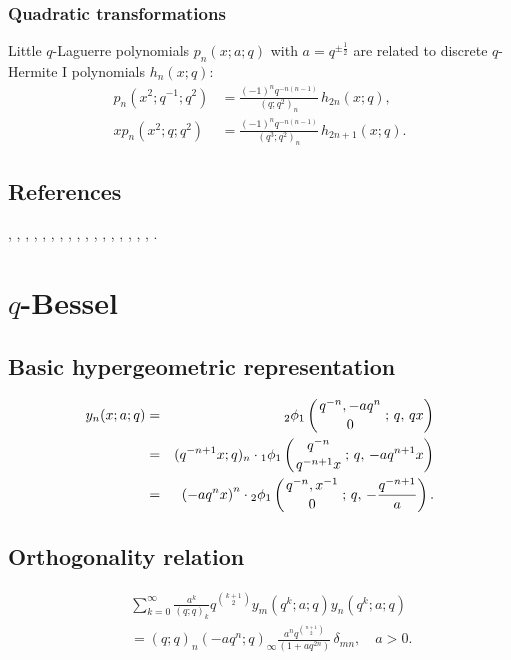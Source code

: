 \documentclass[envcountchap,graybox]{svmono}
\newcommand{\qhyp}[5]{\mbox{}_{#1}{\phi}_{#2}
\left(\genfrac{}{}{0pt}{}{#3}{#4}\,;\,q,\,#5\right)}
\newcommand\half{\frac12}
\newcommand{\qhyp}[5]{\,\mbox{}_{#1}\phi_{#2}\!\left(
  \genfrac{}{}{0pt}{}{#3}{#4};#5\right)}
\begin{document}
{{\subsubsection*{Quadratic transformations}
Little $q$-Laguerre polynomials $p_n(x;a;q)$ with $a=q^{\pm\half}$ are
related to discrete $q$-Hermite I polynomials $h_n(x;q)$:
\begin{align}
p_n(x^2;q^{-1};q^2)&=
\frac{(-1)^n q^{-n(n-1)}}{(q;q^2)_n}\,h_{2n}(x;q),
\label{28}\\
xp_n(x^2;q;q^2)&=
\frac{(-1)^n q^{-n(n-1)}}{(q^3;q^2)_n}\,h_{2n+1}(x;q).
\label{29}
\end{align}
%

\subsection*{References}
\cite{NAlSalam89}, \cite{AlSalam90}, \cite{Askey86}, \cite{Askey89I}, \cite{AskeyWilson85},
\cite{AtakAtakI}, \cite{ChenIsmailMuttalib}, \cite{Chihara68II}, \cite{Chihara78},
\cite{Chihara79}, \cite{Chris}, \cite{Exton77}, \cite{GasperRahman90}, \cite{GrunbaumHaine96},
\cite{Ismail2005I}, \cite{IsmailRahman98}, \cite{Jain95}, \cite{Moak}.


\section{$q$-Bessel}
\par\setcounter{equation}{0}

\subsection*{Basic hypergeometric representation}
\begin{eqnarray}
\label{DefqBessel}
y_n(x;a;q)&=&\qhyp{2}{1}{q^{-n},-aq^n}{0}{qx}\\
&=&(q^{-n+1}x;q)_n\cdot\qhyp{1}{1}{q^{-n}}{q^{-n+1}x}{-aq^{n+1}x}\nonumber\\
&=&\left(-aq^nx\right)^n\cdot\qhyp{2}{1}{q^{-n},x^{-1}}{0}{-\frac{q^{-n+1}}{a}}.\nonumber
\end{eqnarray}

\newpage

\subsection*{Orthogonality relation}
\begin{eqnarray}
\label{OrtqBessel}
& &\sum_{k=0}^{\infty}\frac{a^k}{(q;q)_k}q^{\binom{k+1}{2}}y_m(q^k;a;q)y_n(q^k;a;q)\nonumber\\
& &{}=(q;q)_n(-aq^n;q)_{\infty}\frac{a^nq^{\binom{n+1}{2}}}{(1+aq^{2n})}\,\delta_{mn},\quad a>0.
\end{eqnarray}

}}
\end{document}
